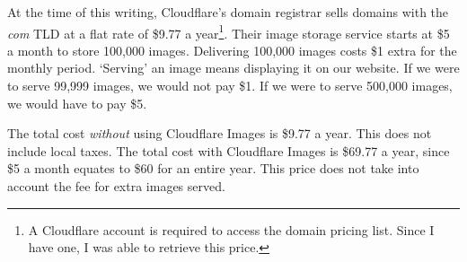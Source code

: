 At the time of this writing, Cloudflare's domain registrar sells domains with the \textit{com} TLD at a flat rate of \$9.77  a year\footnote{A Cloudflare account is required to access the domain pricing list. Since I have one, I was able to retrieve this price.}. Their image storage service starts at \$5  a month to store 100,000 images. Delivering 100,000 images costs \$1  extra for the monthly period. `Serving' an image means displaying it on our website. If we were to serve 99,999 images, we would not pay \$1. If we were to serve 500,000 images, we would have to pay \$5.

The total cost \textit{without} using Cloudflare Images is \$9.77 a year. This does not include local taxes. The total cost with Cloudflare Images is \$69.77 a year, since \$5 a month equates to \$60 for an entire year. This price does not take into account the fee for extra images served.
